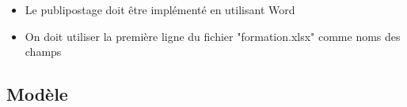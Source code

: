 \documentclass[11pt, a4paper]{article}
\begin{document}
\begin{itemize}
	\item Le publipostage doit être implémenté en utilisant Word
	\item On doit utiliser la première ligne du fichier "formation.xlsx" comme noms des champs
\end{itemize}

\subsection*{Modèle}

\begin{center}
\end{center}
\end{document}
